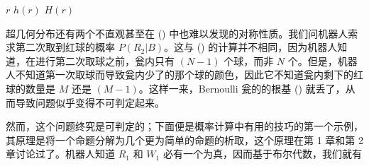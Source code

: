 {\startxtable[offset=0pt]
  \setupinterlinespace[line=1.2em]
  \startxtablehead[topframe=on, rulethickness=1.5pt]
  \startxrow
  \startxcell[width=3cm] $r$ \stopxcell
  \startxcell[width=3cm] $h(r)$ \stopxcell
  \startxcell[width=3cm] $H(r)$ \stopxcell
  \stopxrow
  \stopxtablehead
  \startxtablebody[height=fit]
  \startxrow[topframe=on,rulethickness=0.75pt]
   \stopxcell
   \stopxcell
   \stopxcell
  \stopxrow
  \startxrow
   \stopxcell
   \stopxcell
   \stopxcell
  \stopxrow
  \startxrow
   \stopxcell
   \stopxcell
   \stopxcell
  \stopxrow
  \startxrow
   \stopxcell
   \stopxcell
   \stopxcell
  \stopxrow
  \startxrow
   \stopxcell
   \stopxcell
   \stopxcell
  \stopxrow
  \startxrow
   \stopxcell
   \stopxcell
   \stopxcell
  \stopxrow
  \startxrow
   \stopxcell
   \stopxcell
   \stopxcell
  \stopxrow
  \startxrow
   \stopxcell
   \stopxcell
   \stopxcell
  \stopxrow
  \startxrow
   \stopxcell
   \stopxcell
   \stopxcell
  \stopxrow
  \startxrow
   \stopxcell
   \stopxcell
   \stopxcell
  \stopxrow
  \stopxtablebody
  \startxtablefoot[bottomframe=on,rulethickness=1.5pt]
  \startxrow
   \stopxcell
   \stopxcell
   \stopxcell
  \stopxrow
  \stopxtablefoot
  \stopxtable
}

超几何分布还有两个不直观甚至在 (\in[3-22]) 中也难以发现的对称性质。我们问机器人索求第二次取到红球的概率 $P(R_2|B)$。这与 (\in[3-8]) 的计算并不相同，因为机器人知道，在进行第二次取球之前，瓮内只有 $(N - 1)$ 个球，而非 $N$ 个。但是，机器人不知道第一次取球而导致瓮内少了的那个球的颜色，因此它不知道瓮内剩下的红球的数量是 $M$ 还是 $(M - 1)$。这样一来，Bernoulli 瓮的的根基 (\in[3-5]) 就丢了，从而导致问题似乎变得不可判定起来。

然而，这个问题终究是可判定的；下面便是概率计算中有用的技巧的第一个示例，其原理是将一个命题分解为几个更为简单的命题的析取，这个原理在第 1 章和第 2 章讨论过了。机器人知道 $R_1$ 和 $W_1$ 必有一个为真，因而基于布尔代数，我们就有

